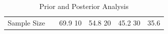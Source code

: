 \begin{table}
\caption{Prior and Posterior Analysis}
\label{tab:percent_helped}
\begin{tabular}{rll}
\toprule
Sample Size & %
 & 69.9%
10 & 54.8%
20 & 45.2%
30 & 35.6%
\bottomrule
\end{tabular}
\end{table}
